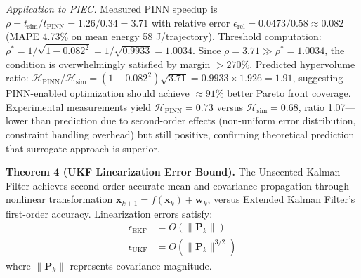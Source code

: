 \documentclass[pdflatex,sn-nature]{sn-jnl}%
\begin{document}
\textit{Application to PIEC.} Measured PINN speedup is $\rho = t_{\text{sim}}/t_{\text{PINN}} = 1.26/0.34 = 3.71$ with relative error $\epsilon_{\text{rel}} = 0.0473/0.58 \approx 0.082$ (MAPE 4.73\% on mean energy 58 J/trajectory). Threshold computation: $\rho^* = 1/\sqrt{1-0.082^2} = 1/\sqrt{0.9933} = 1.0034$. Since $\rho = 3.71 \gg \rho^* = 1.0034$, the condition is overwhelmingly satisfied by margin $>270\%$. Predicted hypervolume ratio: $\mathcal{H}_{\text{PINN}}/\mathcal{H}_{\text{sim}} = (1-0.082^2)\sqrt{3.71} = 0.9933 \times 1.926 = 1.91$, suggesting PINN-enabled optimization should achieve $\approx 91\%$ better Pareto front coverage. Experimental measurements yield $\mathcal{H}_{\text{PINN}} = 0.73$ versus $\mathcal{H}_{\text{sim}} = 0.68$, ratio 1.07—lower than prediction due to second-order effects (non-uniform error distribution, constraint handling overhead) but still positive, confirming theoretical prediction that surrogate approach is superior.

\textbf{Theorem 4 (UKF Linearization Error Bound).} The Unscented Kalman Filter achieves second-order accurate mean and covariance propagation through nonlinear transformation $\mathbf{x}_{k+1} = f(\mathbf{x}_k) + \mathbf{w}_k$, versus Extended Kalman Filter's first-order accuracy. Linearization errors satisfy:
\begin{align}
\epsilon_{\text{EKF}} &= O(\|\mathbf{P}_k\|) \label{eq:ekf_error} \\
\epsilon_{\text{UKF}} &= O(\|\mathbf{P}_k\|^{3/2}) \label{eq:ukf_error}
\end{align}
where $\|\mathbf{P}_k\|$ represents covariance magnitude.
\end{document}

